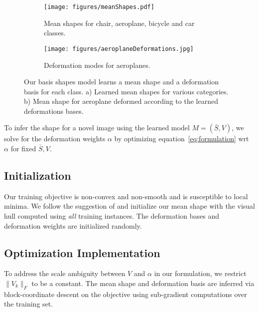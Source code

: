 \begin{figure}[htb!]
\centering
\begin{subfigure}{.45\textwidth}
  \texttt{[image: figures/meanShapes.pdf]}
  \caption{Mean shapes for chair, aeroplane, bicycle and car classes.}
  \label{fig:meanDense}
\end{subfigure}%
\hfill
\begin{subfigure}{.45\textwidth}
  \texttt{[image: figures/aeroplaneDeformations.jpg]}
  \caption{Deformation modes for aeroplanes.}
  \label{fig:denseDeformations}
\end{subfigure}
\caption{Our basis shapes model learns a mean shape and a deformation basis for each class. a) Learned mean shapes for various categories. b) Mean shape for aeroplane deformed according to the learned deformations bases. }
\label{fig:basisShapesModel}
\end{figure}
To infer the shape for a novel image using the learned model $M=(\bar{S},V)$, we solve for the deformation weights $\alpha$ by optimizing equation~\eqref{eq:formulation} wrt $\alpha$ for fixed $\bar{S},V$.

\subsection{Initialization}
Our training objective is non-convex and  non-smooth and is susceptible to local minima. We follow the suggestion of \cite{esteban2004snake} and initialize our mean shape with the visual hull computed using \textit{all} training instances. The deformation bases and deformation weights are initialized randomly.

\subsection{Optimization Implementation}
To address the scale ambiguity between $V$ and $\alpha$ in our formulation, we restrict $\|V_k\|_F$ to be a constant. The mean shape and deformation basis are inferred via block-coordinate descent on the objective using sub-gradient computations over the training set. 